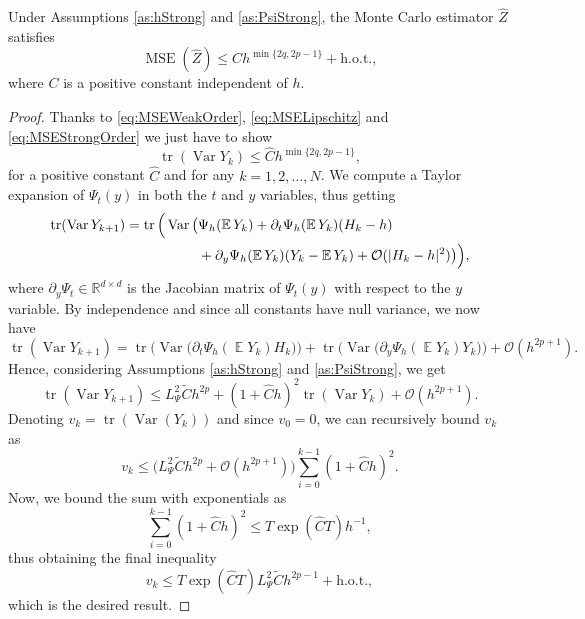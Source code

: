 \documentclass{siamart1116}
\numberwithin{theorem}{section}
\DeclarePairedDelimiter{\abs}{\lvert}{\rvert}
\newcommand{\R}{\mathbb{R}}
\newcommand{\OO}{\mathcal{O}}
\newcommand{\Var}{\operatorname{Var}}
\newcommand{\E}{\operatorname{\mathbb{E}}}
\newcommand{\MSE}{\operatorname{MSE}}
\newcommand{\trace}{\operatorname{tr}}
\newcommand{\sksum}{\textstyle\sum}
\begin{document}
\begin{theorem}\label{thm:MSEMonteCarlo} Under Assumptions \ref{as:hStrong} and \ref{as:PsiStrong}, the Monte Carlo estimator $\hat Z$ satisfies
	\begin{equation}
		\MSE(\hat Z) \leq C h^{\min\{2q, 2p -1\}} + \mathrm{h.o.t.},
	\end{equation}
	where $C$ is a positive constant independent of $h$.
\end{theorem}
\begin{proof} Thanks to \eqref{eq:MSEWeakOrder}, \eqref{eq:MSELipschitz} and \eqref{eq:MSEStrongOrder} we just have to show
	\begin{equation}
		\trace(\Var Y_k) \leq \hat C h^{\min\{2q, 2p - 1\}},
	\end{equation}
	for a positive constant $\hat C$ and for any $k = 1, 2, \ldots, N$. We compute a Taylor expansion of $\Psi_t(y)$ in both the $t$ and $y$ variables, thus getting
	\begin{equation}
	\begin{aligned}
		\trace(\Var Y_{k+1}) = \trace\Big(\Var\big(&\Psi_h(\E Y_k) + \partial_t \Psi_h(\E Y_k)(H_{k} - h) \\
		&+ \partial_y \Psi_h(\E Y_k)(Y_k - \E Y_k) + \OO(\abs{H_k - h}^2)\big)\Big),
	\end{aligned}
	\end{equation}
	where $\partial_y\Psi_t \in \R^{d\times d}$ is the Jacobian matrix of $\Psi_t(y)$ with respect to the $y$ variable. By independence and since all constants have null variance, we now have
	\begin{equation}
		\trace(\Var Y_{k+1}) = \trace\Big(\Var\big(\partial_t \Psi_h(\E Y_k)H_k\big)\Big) + \trace\Big(\Var\big(\partial_y \Psi_h(\E Y_k)Y_k\big)\Big) + \OO(h^{2p + 1}).
	\end{equation}
	Hence, considering Assumptions \ref{as:hStrong} and \ref{as:PsiStrong}, we get
	\begin{equation}
		\trace(\Var Y_{k+1}) \leq L_\Psi^2 \tilde Ch^{2p} + (1 + \hat C h)^2 \trace(\Var Y_k) + \OO(h^{2p + 1}).
	\end{equation}
	Denoting $v_k = \trace(\Var(Y_k))$ and since $v_0 = 0$, we can recursively bound $v_k$ as
	\begin{equation}
		v_k \leq \big(L_\Psi^2\tilde Ch^{2p} + \OO(h^{2p+1})\big) \sksum_{i=0}^{k-1}(1 + \hat C h)^2.
	\end{equation}
	Now, we bound the sum with exponentials as
	\begin{equation}
		\sksum_{i=0}^{k-1}(1 + \hat Ch)^2 \leq T\exp(\hat C T)h^{-1},
	\end{equation}
	thus obtaining the final inequality
	\begin{equation}
		v_k \leq T\exp(\hat C T)L_\Psi^2 \tilde C h^{2p - 1} + \mathrm{h.o.t.},
	\end{equation}
	which is the desired result.
\end{proof}
\end{document}

